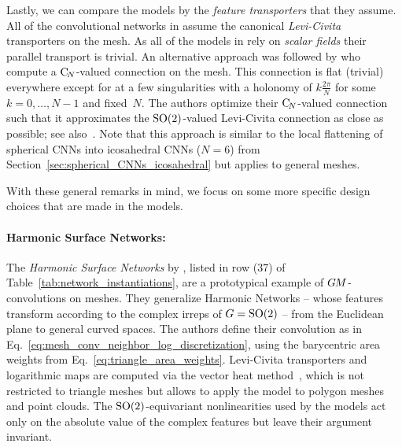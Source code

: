 Lastly, we can compare the models by the \emph{feature transporters} that they assume.
All of the convolutional networks in \cite{Wiersma2020,poulenard2018multi,sun2018zernet,deHaan2020meshCNNs} assume the canonical \emph{Levi-Civita} transporters on the mesh.
As all of the models in \cite{masci2015geodesic,monti2017geometric,sun2018zernet,huang2019texturenet} rely on \emph{scalar fields} their parallel transport is trivial.
An alternative approach was followed by \citet{Yang2020parallelFrameCNN} who compute a $\operatorname{C}_{\!N}$-valued connection on the mesh.
This connection is flat (trivial) everywhere except for at a few singularities with a holonomy of $k\frac{2\pi}{N}$ for some $k=0,\dots,N-1$ and fixed~$N$.
The authors optimize their $\operatorname{C}_{\!N}$-valued connection such that it approximates the $\operatorname{SO}(2)$-valued Levi-Civita connection as close as possible; see also~\cite{craneTrivialConnectionsDiscrete2010}.
Note that this approach is similar to the local flattening of spherical CNNs into icosahedral CNNs ($N=6$) from Section~\ref{sec:spherical_CNNs_icosahedral} but applies to general meshes.




With these general remarks in mind, we focus on some more specific design choices that are made in the models.


\paragraph{Harmonic Surface Networks:}
The \emph{Harmonic Surface Networks} by \citet{Wiersma2020}, listed in row (37) of Table~\ref{tab:network_instantiations},
are a prototypical example of $G\mkern-1.4muM$-convolutions on meshes.
They generalize Harmonic Networks \cite{Worrall2017-HNET} -- whose features transform according to the complex irreps of $G=\operatorname{SO}(2)$ -- from the Euclidean plane to general curved spaces.
The authors define their convolution as in Eq.~\eqref{eq:mesh_conv_neighbor_log_discretization}, using the barycentric area weights from Eq.~\eqref{eq:triangle_area_weights}.
Levi-Civita transporters and logarithmic maps are computed via the vector heat method~\cite{Sharp2019VectorHeatMethod}, which is not restricted to triangle meshes but allows to apply the model to polygon meshes and point clouds.
The $\operatorname{SO}(2)$-equivariant nonlinearities used by the models act only on the absolute value of the complex features but leave their argument invariant.

